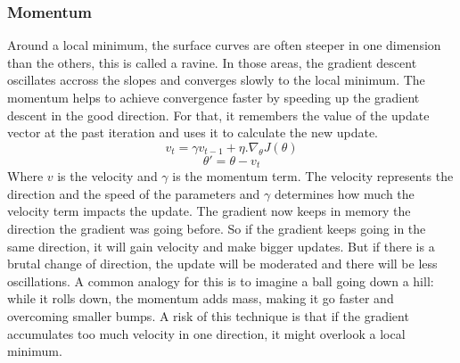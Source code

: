 \subsubsection{Momentum}
Around a local minimum, the surface curves are often steeper in one dimension than the others, this is called a ravine. In those areas, the gradient descent oscillates accross the slopes and converges slowly to the local minimum. The momentum helps to achieve convergence faster by speeding up the gradient descent in the good direction. For that, it remembers the value of the update vector at the past iteration and uses it to calculate the new update. \[ v_t = \gamma v_{t-1} + \eta . \nabla_\theta J(\theta)  \] \[\theta' = \theta - v_t\]
Where \(v\) is the velocity and \(\gamma\) is the momentum term. The velocity represents the direction and the speed of the parameters and \(\gamma\) determines how much the velocity term impacts the update. The gradient now keeps in memory the direction the gradient was going before. So if the gradient keeps going in the same direction, it will gain velocity and make bigger updates. But if there is a brutal change of direction, the update will be moderated and there will be less oscillations. A common analogy for this is to imagine a ball going down a hill: while it rolls down, the momentum adds mass, making it go faster and overcoming smaller bumps. A risk of this technique is that if the gradient accumulates too much velocity in one direction, it might overlook a local minimum. 

